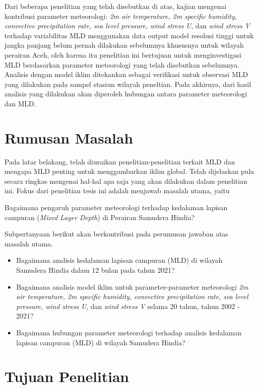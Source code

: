 \begin{spacing}{1.5}
	Dari beberapa penelitian yang telah disebutkan di atas, kajian mengenai kontribusi parameter meteorologi: \textit{2m air temperature, 2m specific humidity, convective precipitation rate, sea level pressure, wind stress U}, dan \textit{wind stress V} terhadap variabilitas MLD menggunakan data output model resolusi tinggi untuk jangka panjang belum pernah dilakukan sebelumnya khususnya untuk wilayah perairan Aceh, oleh karena itu penelitian ini bertujuan untuk menginvestigasi MLD berdasarkan parameter meteorologi yang telah disebutkan sebelumnya. Analisis dengan model iklim ditekankan sebagai verifikasi untuk observasi MLD yang dilakukan pada sampel stasiun wilayah peneltian. Pada akhirnya, dari hasil analisis yang dilakukan akan diperoleh hubungan antara parameter meteorologi dan MLD.
	
	\section[Rumusan Masalah]{Rumusan Masalah}
	Pada latar belakang, telah diuraikan penelitian-penelitian terkait MLD dan mengapa MLD penting untuk menggambarkan iklim global. Telah dijelaskan pula secara ringkas mengenai hal-hal apa saja yang akan dilakukan dalam penelitian ini. Fokus dari penelitian tesis ini adalah menjawab masalah utama, yaitu
	
	Bagaimana pengaruh parameter meteorologi terhadap kedalaman lapisan campuran (\textit{Mixed Layer Depth}) di Perairan Samudera Hindia?
	
	Subpertanyaan berikut akan berkontribusi pada perumusan jawaban atas masalah utama.
	\begin{itemize}
		\item Bagaimana analisis kedalaman lapisan campuran (MLD) di wilayah Samudera Hindia dalam 12 bulan pada tahun 2021? 
		\item Bagaimana analisis model iklim untuk parameter-parameter meteorologi \textit{2m air temperature, 2m specific humidity, convective precipitation rate, sea level pressure, wind stress U}, dan \textit{wind stress V} selama 20 tahun, tahun 2002 - 2021?
		\item Bagaimana hubungan parameter meteorologi terhadap analisis kedalaman lapisan campuran (MLD) di wilayah Samudera Hindia?
	\end{itemize}
	\section[Tujuan Penelitian]{Tujuan Penelitian}
	

\end{spacing}
